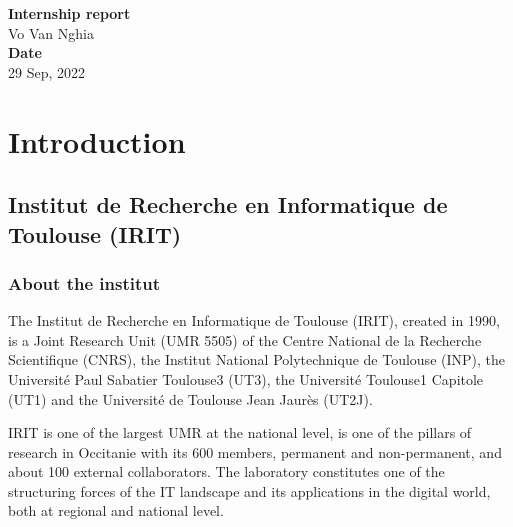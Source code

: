 \documentclass[
  a4paper, xcolor = usenames,dvipsnames]{article}
\author{}
\date{\vspace{-2.5em}}
\begin{document}
\onehalfspacing


\vspace*{\fill}
\begin{center}
  \Large{\textbf{Internship report}}\\
  \vspace*{1\baselineskip}
  Vo Van Nghia\\
  \vfill
  \vspace*{\fill}
  \Large{\textbf{Date}}\\
  29 Sep, 2022
\end{center}

\newpage

\newpage
{}
\renewcommand{\contentsname}{Table of contents}
\tableofcontents

\newpage
{}

\hypertarget{introduction}{%
\section{Introduction}\label{introduction}}

\hypertarget{institut-de-recherche-en-informatique-de-toulouse-irit}{%
\subsection{Institut de Recherche en Informatique de Toulouse (IRIT)}\label{institut-de-recherche-en-informatique-de-toulouse-irit}}

\hypertarget{about-the-institut}{%
\subsubsection{About the institut}\label{about-the-institut}}

The Institut de Recherche en Informatique de Toulouse (IRIT), created in 1990, is a Joint Research Unit (UMR 5505) of the Centre National de la Recherche Scientifique (CNRS), the Institut National Polytechnique de Toulouse (INP), the Université Paul Sabatier Toulouse3 (UT3), the Université Toulouse1 Capitole (UT1) and the Université de Toulouse Jean Jaurès (UT2J).

IRIT is one of the largest UMR at the national level, is one of the pillars of research in Occitanie with its 600 members, permanent and non-permanent, and about 100 external collaborators. The laboratory constitutes one of the structuring forces of the IT landscape and its applications in the digital world, both at regional and national level.
\end{document}
